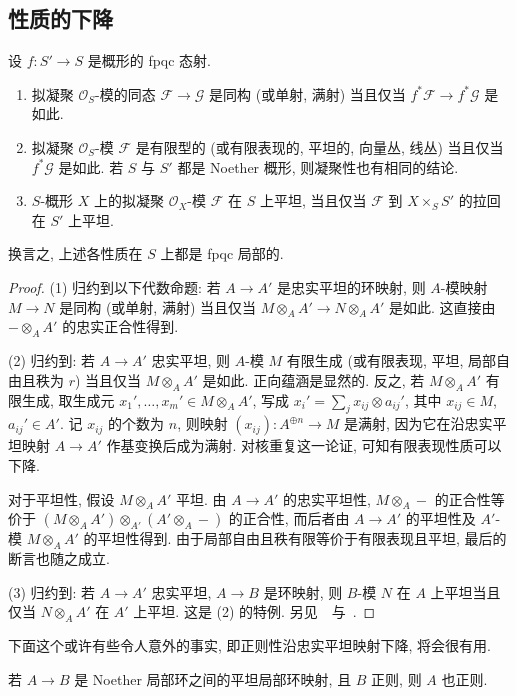 \subsection{性质的下降}\label{src:3.1.4-subsection}
\begin{proposition}\label{src:3.1.18}
设 $f:S'\to S$ 是概形的 fpqc 态射.
\begin{enumerate}
\item 拟凝聚 $\mathcal O_S$-模的同态 $\mathcal F\to\mathcal G$ 是同构 (或单射, 满射) 当且仅当 $f^*\mathcal F\to f^*\mathcal G$ 是如此.
\item 拟凝聚 $\mathcal O_S$-模 $\mathcal F$ 是有限型的 (或有限表现的, 平坦的, 向量丛, 线丛) 当且仅当 $f^*\mathcal G$ 是如此. 若 $S$ 与 $S'$ 都是 Noether 概形, 则凝聚性也有相同的结论.
\item $S$-概形 $X$ 上的拟凝聚 $\mathcal O_X$-模 $\mathcal F$ 在 $S$ 上平坦, 当且仅当 $\mathcal F$ 到 $X\times_S S'$ 的拉回在 $S'$ 上平坦.
\end{enumerate}
换言之, 上述各性质在 $S$ 上都是 fpqc 局部的.
\end{proposition}
\begin{proof}
(1) 归约到以下代数命题: 若 $A\to A'$ 是忠实平坦的环映射, 则 $A$-模映射 $M\to N$ 是同构 (或单射, 满射) 当且仅当 $M\otimes_A A'\to N\otimes_A A'$ 是如此. 这直接由 $-\otimes_A A'$ 的忠实正合性得到.

(2) 归约到: 若 $A\to A'$ 忠实平坦, 则 $A$-模 $M$ 有限生成 (或有限表现, 平坦, 局部自由且秩为 $r$) 当且仅当 $M\otimes_A A'$ 是如此. 正向蕴涵是显然的. 反之, 若 $M\otimes_A A'$ 有限生成, 取生成元 $x_1',\ldots,x_m'\in M\otimes_A A'$, 写成 $x_i'=\sum_j x_{ij}\otimes a_{ij}'$, 其中 $x_{ij}\in M$, $a_{ij}'\in A'$. 记 $x_{ij}$ 的个数为 $n$, 则映射 $(x_{ij}):A^{\oplus n}\to M$ 是满射, 因为它在沿忠实平坦映射 $A\to A'$ 作基变换后成为满射. 对核重复这一论证, 可知有限表现性质可以下降.

对于平坦性, 假设 $M\otimes_A A'$ 平坦. 由 $A\to A'$ 的忠实平坦性, $M\otimes_A-$ 的正合性等价于 $(M\otimes_A A')\otimes_{A'}(A'\otimes_A-)$ 的正合性, 而后者由 $A\to A'$ 的平坦性及 $A'$-模 $M\otimes_A A'$ 的平坦性得到. 由于局部自由且秩有限等价于有限表现且平坦, 最后的断言也随之成立.

(3) 归约到: 若 $A\to A'$ 忠实平坦, $A\to B$ 是环映射, 则 $B$-模 $N$ 在 $A$ 上平坦当且仅当 $N\otimes_A A'$ 在 $A'$ 上平坦. 这是 (2) 的特例. 另见~\cite[IV2.2.5]{EGA}~与~\cite[Tag 05AY]{SP}.
\end{proof}
下面这个或许有些令人意外的事实, 即正则性沿忠实平坦映射下降, 将会很有用.
\begin{lemma}\label{src:3.1.19}
若 $A\to B$ 是 Noether 局部环之间的平坦局部环映射, 且 $B$ 正则, 则 $A$ 也正则.
\end{lemma}
